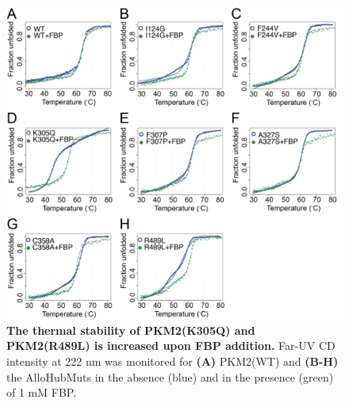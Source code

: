 %
%
%
%
%
%
\begin{figure}[!ht]
\includegraphics[scale=0.7]{ch7_fig4_unfolding_fbp.png}
\caption[The thermal stability of PKM2(K305Q) and PKM2(R489L) is increased upon FBP addition.] {\textbf{The thermal stability of PKM2(K305Q) and PKM2(R489L) is increased upon FBP addition.} Far-UV CD intensity at 222 nm was monitored for \textbf{(A)} PKM2(WT) and \textbf{(B-H)} the AlloHubMuts in the absence (blue) and in the presence (green) of 1 mM FBP.}
\label{fig:unfolding_fbp}
\end{figure}
%
%
\clearpage


